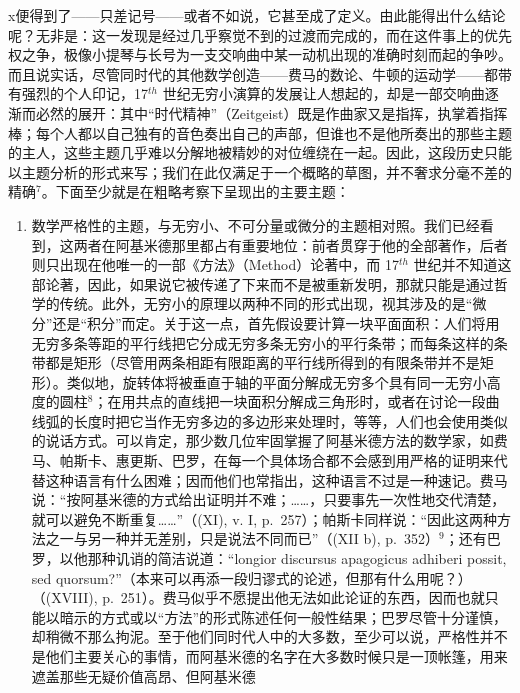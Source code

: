 x\)便得到了——只差记号——或者不如说，它甚至成了定义。由此能得出什么结论呢？无非是：这一发现是经过几乎察觉不到的过渡而完成的，而在这件事上的优先权之争，极像小提琴与长号为一支交响曲中某一动机出现的准确时刻而起的争吵。而且说实话，尽管同时代的其他数学创造——费马的数论、牛顿的运动学——都带有强烈的个人印记，17\(^{th}\) 世纪无穷小演算的发展让人想起的，却是一部交响曲逐渐而必然的展开：其中“时代精神”（Zeitgeist）既是作曲家又是指挥，执掌着指挥棒；每个人都以自己独有的音色奏出自己的声部，但谁也不是他所奏出的那些主题的主人，这些主题几乎难以分解地被精妙的对位缠绕在一起。因此，这段历史只能以主题分析的形式来写；我们在此仅满足于一个概略的草图，并不奢求分毫不差的精确\(^{7}\)。下面至少就是在粗略考察下呈现出的主要主题：

\begin{enumerate}
\def\labelenumi{\Alph{enumi})}
\tightlist
\item
  数学严格性的主题，与无穷小、不可分量或微分的主题相对照。我们已经看到，这两者在阿基米德那里都占有重要地位：前者贯穿于他的全部著作，后者则只出现在他唯一的一部《方法》（Method）论著中，而 17\(^{th}\) 世纪并不知道这部论著，因此，如果说它被传递了下来而不是被重新发明，那就只能是通过哲学的传统。此外，无穷小的原理以两种不同的形式出现，视其涉及的是“微分”还是“积分”而定。关于这一点，首先假设要计算一块平面面积：人们将用无穷多条等距的平行线把它分成无穷多条无穷小的平行条带；而每条这样的条带都是矩形（尽管用两条相距有限距离的平行线所得到的有限条带并不是矩形）。类似地，旋转体将被垂直于轴的平面分解成无穷多个具有同一无穷小高度的圆柱\(^{8}\)；在用共点的直线把一块面积分解成三角形时，或者在讨论一段曲线弧的长度时把它当作无穷多边的多边形来处理时，等等，人们也会使用类似的说话方式。可以肯定，那少数几位牢固掌握了阿基米德方法的数学家，如费马、帕斯卡、惠更斯、巴罗，在每一个具体场合都不会感到用严格的证明来代替这种语言有什么困难；因而他们也常指出，这种语言不过是一种速记。费马说：“按阿基米德的方式给出证明并不难；……，只要事先一次性地交代清楚，就可以避免不断重复……”（(XI), v. I, p.~257）；帕斯卡同样说：“因此这两种方法之一与另一种并无差别，只是说法不同而已”（(XII b), p.~352）\(^{9}\)；还有巴罗，以他那种讥诮的简洁说道：“longior discursus apagogicus adhiberi possit, sed quorsum?”（本来可以再添一段归谬式的论述，但那有什么用呢？）（(XVIII), p.~251）。费马似乎不愿提出他无法如此论证的东西，因而也就只能以暗示的方式或以“方法”的形式陈述任何一般性结果；巴罗尽管十分谨慎，却稍微不那么拘泥。至于他们同时代人中的大多数，至少可以说，严格性并不是他们主要关心的事情，而阿基米德的名字在大多数时候只是一顶帐篷，用来遮盖那些无疑价值高昂、但阿基米德
\end{enumerate}

